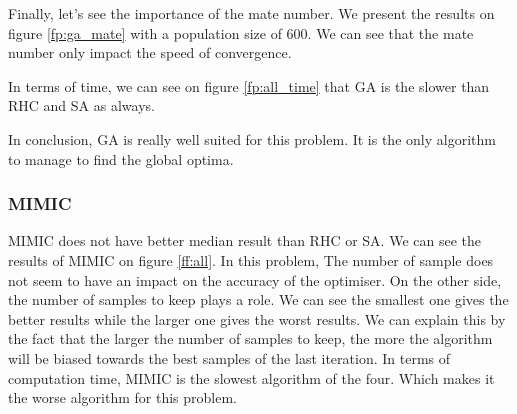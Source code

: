 \documentclass[10pt]{article}
\begin{document}
				Finally, let's see the importance of the mate number. We present the results on figure \ref{fp:ga_mate} with a population size of 600. We can see that the mate number only impact the speed of convergence.

				In terms of time, we can see on figure \ref{fp:all_time} that GA is the slower than RHC and SA as always.

				In conclusion, GA is really well suited for this problem. It is the only algorithm to manage to find the global optima.
			\subsubsection*{MIMIC}
				MIMIC does not have better median result than RHC or SA. We can see the results of MIMIC on figure \ref{ff:all}. In this problem, The number of sample does not seem to have an impact on the accuracy of the optimiser. On the other side, the number of samples to keep plays a role. We can see the smallest one gives the better results while the larger one gives the worst results. We can explain this by the fact that the larger the number of samples to keep, the more the algorithm will be biased towards the best samples of the last iteration. In terms of computation time, MIMIC is the slowest algorithm of the four. Which makes it the worse algorithm for this problem.
\end{document}
